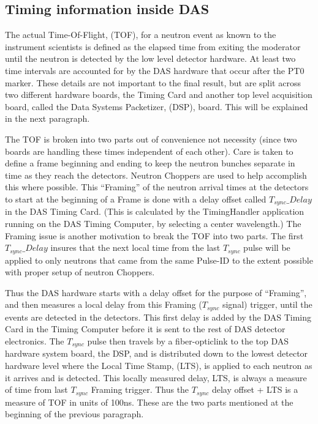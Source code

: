 \subsection {Timing information inside DAS}
The actual Time-Of-Flight, (TOF), for a neutron event as known to the instrument scientists is defined as the elapsed time from exiting the moderator until the neutron is detected by the low level detector hardware.  At least two time intervals are accounted for by the DAS hardware that occur after the PT0 marker.  These details are not important to the final result, but are split across two different hardware boards, the Timing Card and another top level acquisition board, called the Data Systems Packetizer, (DSP), board.   This will be explained in the next paragraph.

The TOF is broken into two parts out of convenience not necessity (since two boards are handling these times independent of each other).  Care is taken to define a frame beginning and ending to keep the neutron bunches separate in time as they reach the detectors.  Neutron Choppers are used to help accomplish this where possible.  This ``Framing'' of the neutron arrival times at the detectors to start at the beginning of a Frame is done with a delay offset called $T_{sync}\_Delay$ in the DAS Timing Card.  (This is calculated by the TimingHandler application running on the DAS Timing Computer, by selecting a center wavelength.)   The Framing issue is another motivation to break the TOF into two parts.  The first $T_{sync}\_Delay$ insures that the next local time from the last $T_{sync}$ pulse will be applied to only neutrons that came from the same Pulse-ID to the extent possible with proper setup of neutron Choppers.

Thus the DAS hardware starts with a delay offset for the purpose of ``Framing'', and then measures a local delay from this Framing ($T_{sync}$ signal) trigger, until the events are detected in the detectors.   This first delay is added by the DAS Timing Card in the Timing Computer before it is sent to the rest of DAS detector electronics.  The $T_{sync}$ pulse then travels by a fiber-opticlink to the top DAS hardware system board, the DSP, and is distributed down to the lowest detector hardware level where the Local Time Stamp, (LTS), is applied to each neutron as it arrives and is detected.   This locally measured delay, LTS, is always a measure of time from last $T_{sync}$ Framing trigger.  Thus the $T_{sync}$ delay offset + LTS is a measure of TOF in units of {100ns}.   These are the two parts mentioned at the beginning of the previous paragraph.


